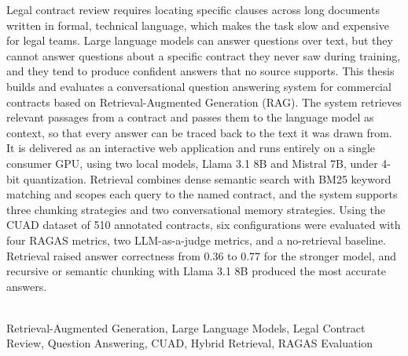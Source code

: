 
\begin{abstracteng}
Legal contract review requires locating specific clauses across long documents written in formal, technical language, which makes the task slow and expensive for legal teams. Large language models can answer questions over text, but they cannot answer questions about a specific contract they never saw during training, and they tend to produce confident answers that no source supports. This thesis builds and evaluates a conversational question answering system for commercial contracts based on Retrieval-Augmented Generation (RAG). The system retrieves relevant passages from a contract and passes them to the language model as context, so that every answer can be traced back to the text it was drawn from. It is delivered as an interactive web application and runs entirely on a single consumer GPU, using two local models, Llama 3.1 8B and Mistral 7B, under 4-bit quantization. Retrieval combines dense semantic search with BM25 keyword matching and scopes each query to the named contract, and the system supports three chunking strategies and two conversational memory strategies. Using the CUAD dataset of 510 annotated contracts, six configurations were evaluated with four RAGAS metrics, two LLM-as-a-judge metrics, and a no-retrieval baseline. Retrieval raised answer correctness from 0.36 to 0.77 for the stronger model, and recursive or semantic chunking with Llama 3.1 8B produced the most accurate answers.

\vspace*{\fill}
\\ 
Retrieval-Augmented Generation, Large Language Models, Legal Contract Review, Question Answering, CUAD, Hybrid Retrieval, RAGAS Evaluation
\end{abstracteng}